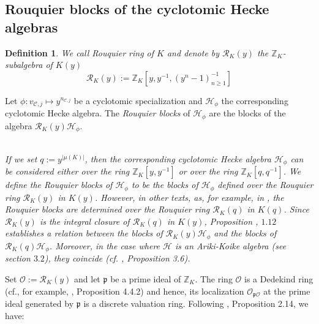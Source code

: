 \documentclass[10pt,a4paper,titlepage]{article}
\newtheorem{definition}[theorem]{Definition}
\begin{document}
\subsection {Rouquier blocks of the cyclotomic Hecke algebras}

\begin{definition}\label{Rouquier ring}
We call Rouquier ring of $K$ and denote by $\mathcal{R}_K(y)$ the
$\mathbb{Z}_K$-subalgebra of $K(y)$
$$\mathcal{R}_K(y):=\mathbb{Z}_K[y,y^{-1},(y^n-1)^{-1}_{n\geq 1}]$$
\end{definition}

Let $\phi: v_{\mathcal{C},j} \mapsto y^{n_{\mathcal{C},j}}$ be a
cyclotomic specialization and $\mathcal{H}_\phi$ the corresponding
cyclotomic Hecke algebra. The \emph{Rouquier blocks} of
$\mathcal{H}_\phi$ are the blocks of the algebra
$\mathcal{R}_K(y)\mathcal{H}_\phi$.\\
\\
\begin{remark}\emph{ If we set $q:=y^{|\mu(K)|}$, then the corresponding cyclotomic Hecke algebra $\mathcal{H}_\phi$ can be considered either over the ring $\mathbb{Z}_{K}[y,y^{-1}]$ or over the ring $\mathbb{Z}_{K}[q,q^{-1}]$. We define the Rouquier blocks of  $\mathcal{H}_\phi$ to be the blocks of  $\mathcal{H}_\phi$ defined over the Rouquier ring $\mathcal{R}_{K}(y)$ in $K(y)$. However, in other texts, as, for example, in \cite{BK}, the Rouquier blocks are determined over the Rouquier ring $\mathcal{R}_{K}(q)$ in $K(q)$. Since $\mathcal{R}_{K}(y)$ is the integral closure of $\mathcal{R}_{K}(q)$ in $K(y)$, Proposition \cite{BK}, $1.12$ establishes a relation between the blocks of
$\mathcal{R}_{K}(y)\mathcal{H}_\phi$ and the blocks of $\mathcal{R}_{K}(q)\mathcal{H}_\phi$. Moreover, in the case where $\mathcal{H}$ is an Ariki-Koike algebra (see section $3.2$),  they coincide (cf. \cite{Chlou2}, Proposition 3.6).}
\end{remark}
$ $\\

Set $\mathcal{O}:=\mathcal{R}_{K}(y)$ and let $\mathfrak{p}$ be a prime ideal of $\mathbb{Z}_K$.
The ring $\mathcal{O}$ is a Dedekind ring (cf., for example, \cite{Chlou}, Proposition 4.4.2) and hence, its localization  $\mathcal{O}_{\mathfrak{p}\mathcal{O}}$ at the prime ideal generated by $\mathfrak{p}$ is a discrete valuation ring. Following \cite{Chlou2}, Proposition 2.14, we have:
\end{document}
